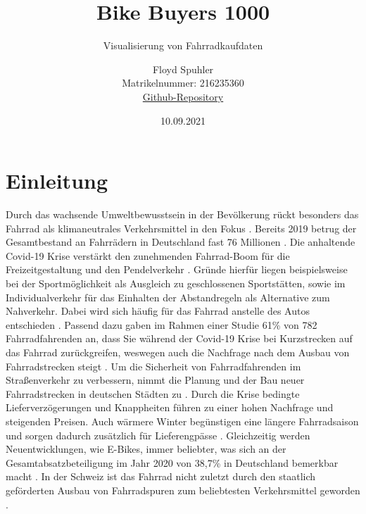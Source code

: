 \documentclass[usegeometry=true]{scrartcl}
\begin{document}
\subject{Projektbericht zum Modul Information Retrieval und Visualisierung Sommersemester 2021}

\title{Bike Buyers 1000}
\subtitle{Visualisierung von Fahrradkaufdaten}
\author{Floyd Spuhler\\ Matrikelnummer: 216235360 \\ \href{https://github.com/floeagle/Bike-Buyers-1000}{Github-Repository}}



\date{10.09.2021}
\maketitle%
\thispagestyle{empty}
\newpage
\thispagestyle{empty}
\tableofcontents
\newpage
{}
\section{Einleitung}
Durch das wachsende Umweltbewusstsein in der Bevölkerung rückt besonders das Fahrrad als klimaneutrales Verkehrsmittel in den Fokus \cite{Marquart.2021}. Bereits 2019 betrug der Gesamtbestand an Fahrrädern in Deutschland fast 76 Millionen \cite{Kords.26.06.2020,Statista.25.08.2021}. Die anhaltende Covid-19 Krise verstärkt den zunehmenden Fahrrad-Boom für die Freizeitgestaltung und den Pendelverkehr \cite{Platter.2020}. Gründe hierfür liegen beispielsweise bei der Sportmöglichkeit als Ausgleich zu geschlossenen Sportstätten, sowie im Individualverkehr für das Einhalten der Abstandregeln als Alternative zum Nahverkehr. Dabei wird sich häufig für das Fahrrad anstelle des Autos entschieden \cite{Kollner.30.12.2020,Thomannbusse.24.11.2020}. Passend dazu gaben im Rahmen einer Studie 61\%  von 782 Fahrradfahrenden an, dass Sie während der Covid-19 Krise bei Kurzstrecken auf das Fahrrad zurückgreifen, weswegen auch die Nachfrage nach dem Ausbau von Fahrradstrecken steigt \cite{sinus.2021}. Um die Sicherheit von Fahrradfahrenden im Straßenverkehr zu verbessern, nimmt die Planung und der Bau neuer Fahrradstrecken in deutschen Städten zu \cite{sinus.2021,ADAC.05.09.2021,Muenchen.de.05.09.2021}. Durch die Krise bedingte Lieferverzögerungen und Knappheiten führen zu einer hohen Nachfrage und steigenden Preisen. Auch wärmere Winter begünstigen eine längere Fahrradsaison und sorgen dadurch zusätzlich für Lieferengpässe \cite{tagesschau.11.03.2021}. Gleichzeitig werden Neuentwicklungen, wie E-Bikes, immer beliebter, was sich an der Gesamtabsatzbeteiligung im Jahr 2020 von 38,7\% in Deutschland bemerkbar macht \cite{tagesschau.11.03.2021}. 
In der Schweiz ist das Fahrrad nicht zuletzt durch den staatlich geförderten Ausbau von Fahrradspuren zum beliebtesten Verkehrsmittel geworden \cite{Platter.2020}.
\end{document}
